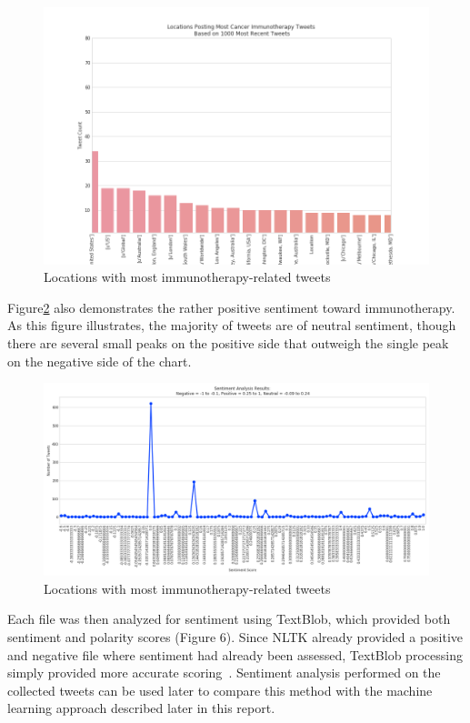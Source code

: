 \begin{figure}[H]
\centering
\includegraphics[width=\columnwidth]{images/barchart.png}
\caption{Locations with most immunotherapy-related tweets}
\label{fig:barchart}
\end{figure} 

Figure\ref{fig:sentline} also demonstrates the rather positive
sentiment toward immunotherapy.  As this figure illustrates, the
majority of tweets are of neutral sentiment, though there are several
small peaks on the positive side that outweigh the single peak on the
negative side of the chart.

\begin{figure}[H]
\centering
\includegraphics[width=\columnwidth]{images/sentiment_scores_linechart.png}
\caption{Locations with most immunotherapy-related tweets}
\label{fig:sentline}
\end{figure} 

Each file was then analyzed for sentiment using TextBlob, which
provided both sentiment and polarity scores (Figure 6).  Since NLTK
already provided a positive and negative file where sentiment had
already been assessed, TextBlob processing simply provided more
accurate scoring~\cite{jain2018}.  Sentiment analysis performed on the
collected tweets can be used later to compare this method with the
machine learning approach described later in this report.

